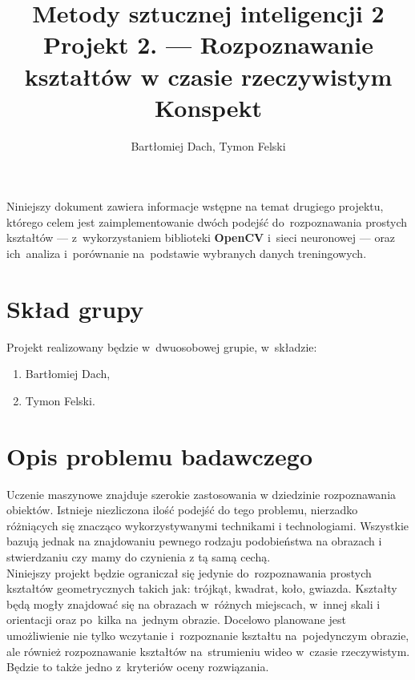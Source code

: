 \documentclass[11pt,a4paper]{article}
\begin{document}
\title{Metody sztucznej inteligencji 2 \\
\Large{
    Projekt 2. --- Rozpoznawanie kształtów w czasie rzeczywistym \\
    Konspekt
}}
\author{Bartłomiej Dach, Tymon Felski}
\maketitle

\noindent
Niniejszy dokument zawiera informacje wstępne na temat drugiego projektu, którego celem jest zaimplementowanie dwóch podejść do~rozpoznawania prostych kształtów --- z~wykorzystaniem biblioteki \textbf{OpenCV} i~sieci neuronowej --- oraz ich~analiza i~porównanie na~podstawie wybranych danych treningowych.

\section{Skład grupy}

Projekt realizowany będzie w~dwuosobowej grupie, w~składzie:
\begin{enumerate}
    \setlength\itemsep{-.4em}
    \item Bartłomiej Dach,
    \item Tymon Felski.
\end{enumerate}

\section{Opis problemu badawczego}

Uczenie maszynowe znajduje szerokie zastosowania w dziedzinie rozpoznawania obiektów. Istnieje niezliczona ilość podejść do tego problemu, nierzadko różniących się znacząco wykorzystywanymi technikami i technologiami. Wszystkie bazują jednak na znajdowaniu pewnego rodzaju podobieństwa na obrazach i stwierdzaniu czy mamy do czynienia z tą samą cechą.\\

Niniejszy projekt będzie ograniczał się jedynie do~rozpoznawania prostych kształtów geometrycznych takich jak: trójkąt, kwadrat, koło, gwiazda. Kształty będą mogły znajdować się na obrazach w~różnych miejscach, w~innej skali i orientacji oraz po~kilka na~jednym obrazie. Docelowo planowane jest umożliwienie nie tylko wczytanie i~rozpoznanie kształtu na~pojedynczym obrazie, ale również rozpoznawanie kształtów na~strumieniu wideo w~czasie rzeczywistym. Będzie to także jedno z~kryteriów oceny rozwiązania.
\end{document}
